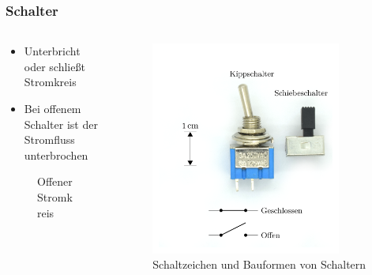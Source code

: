 \begin{frame}
\frametitle{Schalter}
\begin{columns}
    \begin{column}{0.48\textwidth}
    \begin{itemize}
  \item Unterbricht oder schließt Stromkreis
  \item Bei offenem Schalter ist der Stromfluss unterbrochen
  \end{itemize}

\begin{figure}
    \caption{\scriptsize Offener Stromkreis}
    \label{n_stromkreis_offen}
\end{figure}


    \end{column}
   \begin{column}{0.48\textwidth}
       
\begin{figure}
    \includegraphics[width=0.85\textwidth]{foto/202}
    \caption{\scriptsize Schaltzeichen und Bauformen von Schaltern}
    \label{n_stromkreis_schalter}
\end{figure}

   \end{column}
\end{columns}

\end{frame}

